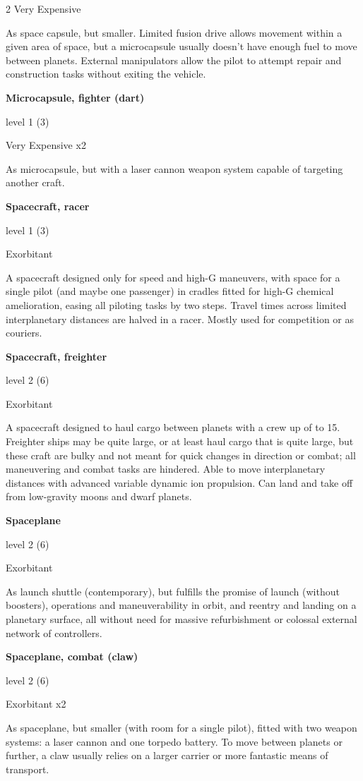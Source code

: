 \begin{multicols}{2}
Very Expensive 

As space capsule, but smaller. Limited fusion drive allows movement within a given area of space, but a microcapsule usually doesn’t have enough fuel to move between planets. External manipulators allow the pilot to attempt repair and construction tasks without exiting the vehicle. 

\textbf{Microcapsule, fighter (dart)} 

level 1 (3) 

Very Expensive x2 

As microcapsule, but with a laser cannon weapon system capable of targeting another craft. 

\textbf{Spacecraft, racer} 

level 1 (3) 

Exorbitant 

A spacecraft designed only for speed and high-G maneuvers, with space for a single pilot (and maybe one passenger) in cradles fitted for high-G chemical amelioration, easing all piloting tasks by two steps. Travel times across limited interplanetary distances are halved in a racer. Mostly used for competition or as couriers. 

\textbf{Spacecraft, freighter} 

level 2 (6) 

Exorbitant 

A spacecraft designed to haul cargo between planets with a crew up of to 15. Freighter ships may be quite large, or at least haul cargo that is quite large, but these craft are bulky and not meant for quick changes in direction or combat; all maneuvering and combat tasks are hindered. Able to move interplanetary distances with advanced variable dynamic ion propulsion. Can land and take off from low-gravity moons and dwarf planets. 

\textbf{Spaceplane} 

level 2 (6) 

Exorbitant 

As launch shuttle (contemporary), but fulfills the promise of launch (without boosters), operations and maneuverability in orbit, and reentry and landing on a planetary surface, all without need for massive refurbishment or colossal external network of controllers.

\textbf{Spaceplane, combat (claw)} 

level 2 (6) 

Exorbitant x2 

As spaceplane, but smaller (with room for a single pilot), fitted with two weapon systems: a laser cannon and one torpedo battery. To move between planets or further, a claw usually relies on a larger carrier or more fantastic means of transport. 


\end{multicols}
